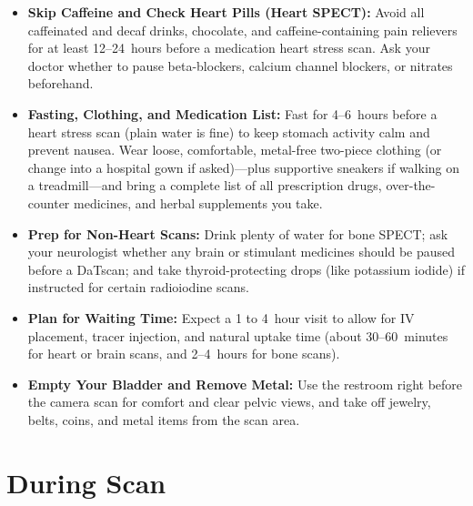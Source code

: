 \begin{itemize}
    \item \textbf{Skip Caffeine and Check Heart Pills (Heart SPECT):} Avoid all caffeinated and decaf drinks, chocolate, and caffeine-containing pain relievers for at least 12--24~hours before a medication heart stress scan. Ask your doctor whether to pause beta-blockers, calcium channel blockers, or nitrates beforehand.
    \item \textbf{Fasting, Clothing, and Medication List:} Fast for 4--6~hours before a heart stress scan (plain water is fine) to keep stomach activity calm and prevent nausea. Wear loose, comfortable, metal-free two-piece clothing (or change into a hospital gown if asked)---plus supportive sneakers if walking on a treadmill---and bring a complete list of all prescription drugs, over-the-counter medicines, and herbal supplements you take.
    \item \textbf{Prep for Non-Heart Scans:} Drink plenty of water for bone SPECT; ask your neurologist whether any brain or stimulant medicines should be paused before a DaTscan; and take thyroid-protecting drops (like potassium iodide) if instructed for certain radioiodine scans.
    \item \textbf{Plan for Waiting Time:} Expect a 1 to 4~hour visit to allow for IV placement, tracer injection, and natural uptake time (about 30--60~minutes for heart or brain scans, and 2--4~hours for bone scans).
    \item \textbf{Empty Your Bladder and Remove Metal:} Use the restroom right before the camera scan for comfort and clear pelvic views, and take off jewelry, belts, coins, and metal items from the scan area.
\end{itemize}

\section{During Scan}

